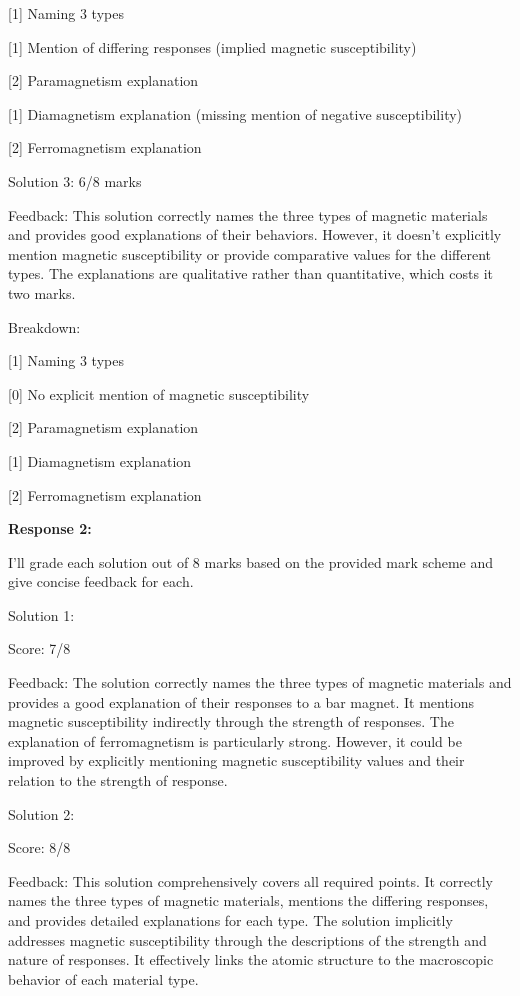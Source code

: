 \documentclass[a4paper,11pt]{article}
\begin{document}
[1] Naming 3 types

[1] Mention of differing responses (implied magnetic susceptibility)

[2] Paramagnetism explanation

[1] Diamagnetism explanation (missing mention of negative susceptibility)

[2] Ferromagnetism explanation

Solution 3: 6/8 marks

Feedback: This solution correctly names the three types of magnetic materials and provides good explanations of their behaviors. However, it doesn't explicitly mention magnetic susceptibility or provide comparative values for the different types. The explanations are qualitative rather than quantitative, which costs it two marks.

Breakdown:

[1] Naming 3 types

[0] No explicit mention of magnetic susceptibility

[2] Paramagnetism explanation

[1] Diamagnetism explanation

[2] Ferromagnetism explanation

\bigskip
\textbf{Response 2:}

I'll grade each solution out of 8 marks based on the provided mark scheme and give concise feedback for each.

Solution 1:

Score: 7/8

Feedback: The solution correctly names the three types of magnetic materials and provides a good explanation of their responses to a bar magnet. It mentions magnetic susceptibility indirectly through the strength of responses. The explanation of ferromagnetism is particularly strong. However, it could be improved by explicitly mentioning magnetic susceptibility values and their relation to the strength of response.

Solution 2:

Score: 8/8

Feedback: This solution comprehensively covers all required points. It correctly names the three types of magnetic materials, mentions the differing responses, and provides detailed explanations for each type. The solution implicitly addresses magnetic susceptibility through the descriptions of the strength and nature of responses. It effectively links the atomic structure to the macroscopic behavior of each material type.
\end{document}
